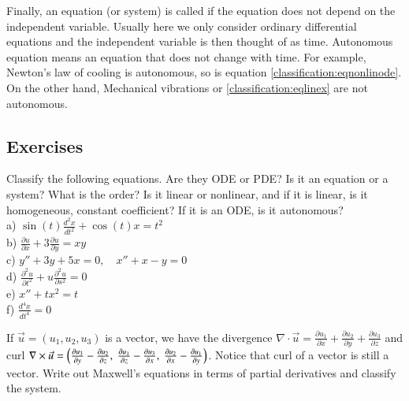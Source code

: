 \documentclass[12pt]{book}
\begin{document}
\medskip

Finally, an equation (or system) is called \emph{}
if the equation does not depend on the independent variable.
Usually here we only consider ordinary differential equations and the
independent variable is then thought of as time.  Autonomous equation
means an equation that does not change with time.
For example, Newton's law of cooling is autonomous, so is equation
\eqref{classification:eqnonlinode}.  On the other hand, Mechanical
vibrations or 
\eqref{classification:eqlinex} are not autonomous.

\subsection{Exercises}

\begin{exercise}
Classify the following equations.  Are they ODE or PDE?  Is it an equation
or a system?  What is the order?  Is it linear or nonlinear, and if it is
linear, is it homogeneous, constant coefficient?  If it is an ODE, is it
autonomous?\\[3pt]
a) $\displaystyle \sin(t) \frac{d^2 x}{dt^2} + \cos(t) x = t^2$ \\[3pt]
b) $\displaystyle \frac{\partial u}{\partial x} + 3 \frac{\partial u}{\partial y} = xy$
\\[3pt]
c) $\displaystyle y''+3y+5x=0, \quad x''+x-y=0$ \\[3pt]
d) $\displaystyle \frac{\partial^2 u}{\partial t^2} + u\frac{\partial^2 u}{\partial s^2} =
0$ \\[3pt]
e) $\displaystyle x''+tx^2=t$ \\[3pt]
f) $\displaystyle \frac{d^4 x}{dt^4} = 0$
\end{exercise}

\begin{exercise}
If $\vec{u} = (u_1,u_2,u_3)$ is a vector, we have the divergence
$\nabla \cdot \vec{u} =
\frac{\partial u_1}{\partial x} +
\frac{\partial u_2}{\partial y} +
\frac{\partial u_3}{\partial z}$ and curl
$\nabla \times \vec{u} =
\Bigl(
\frac{\partial u_3}{\partial y} - \frac{\partial u_2}{\partial z} , ~
\frac{\partial u_1}{\partial z} - \frac{\partial u_3}{\partial x} , ~
\frac{\partial u_2}{\partial x} - \frac{\partial u_1}{\partial y} \Bigr)$.
Notice that curl of a vector is still a vector.  Write out Maxwell's
equations in terms of partial derivatives and classify the system.
\end{exercise}
\end{document}

